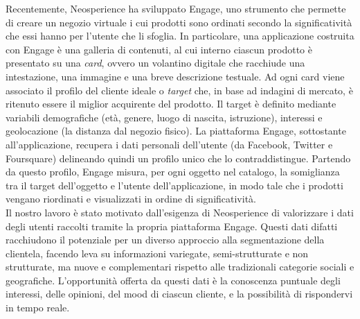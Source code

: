 Recentemente, Neosperience ha sviluppato Engage, uno strumento che permette di creare un negozio virtuale i cui prodotti sono ordinati secondo la significativit\`a che essi hanno per l'utente che li sfoglia. In particolare, una applicazione costruita con Engage \`e una galleria di contenuti, al cui interno ciascun prodotto \`e presentato su una \textit{card}, ovvero un volantino digitale che racchiude una intestazione, una immagine e una breve descrizione testuale. Ad ogni card viene associato il profilo del cliente ideale o \textit{target} che, in base ad indagini di mercato, \`e ritenuto essere il miglior acquirente del prodotto. Il target \`e definito mediante variabili demografiche (et\`a, genere, luogo di nascita, istruzione), interessi e geolocazione (la distanza dal negozio fisico).
La piattaforma Engage, sottostante all'applicazione, recupera i dati personali dell'utente (da Facebook, Twitter e Foursquare) delineando quindi un profilo unico che lo contraddistingue. Partendo da questo profilo, Engage misura, per ogni oggetto nel catalogo, la somiglianza tra il target dell'oggetto e l'utente dell'applicazione, in modo tale che i prodotti vengano riordinati e visualizzati in ordine di significativit\`a.\\
Il nostro lavoro \`e stato motivato dall'esigenza di Neosperience di valorizzare i dati degli utenti raccolti tramite la propria piattaforma Engage. Questi dati difatti racchiudono il potenziale per un diverso approccio alla segmentazione della clientela, facendo leva su informazioni variegate, semi-strutturate e non strutturate, ma nuove e complementari rispetto alle tradizionali categorie sociali e geografiche. L'opportunit\`a offerta da questi dati \`e la conoscenza puntuale degli interessi, delle opinioni, del mood di ciascun cliente, e la possibilit\`a di rispondervi in tempo reale.
